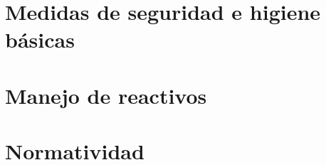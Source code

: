 


\section{Medidas de seguridad e higiene básicas}



\section{Manejo de reactivos}



\section{Normatividad}




\putbib